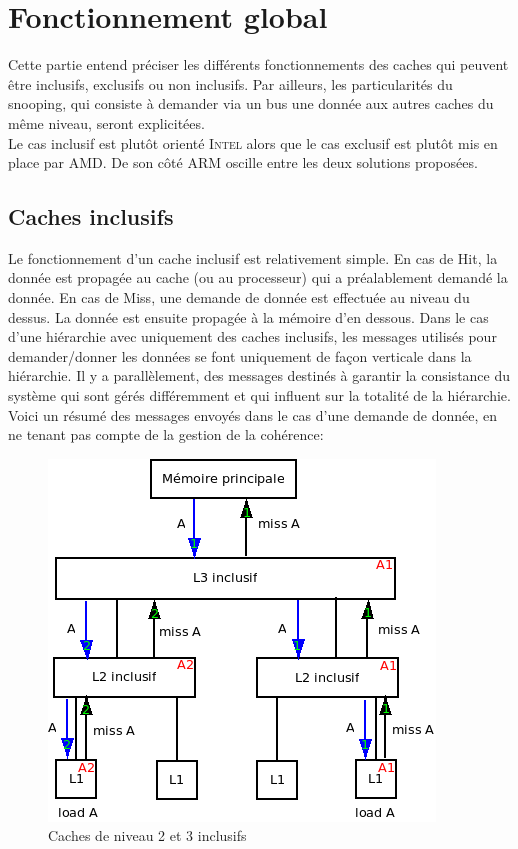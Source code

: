 \documentclass[a4paper]{article}
\begin{document}
\newpage
\section{Fonctionnement global}
\indent Cette partie entend préciser les différents fonctionnements des caches qui peuvent être inclusifs, exclusifs ou non inclusifs. Par ailleurs, les particularités du snooping, qui consiste à demander via un bus une donnée aux autres caches du même niveau, seront explicitées. \\

\indent Le cas inclusif est plutôt orienté \textsc{Intel} alors que le cas exclusif est plutôt mis en place par \textsc{AMD}. De son côté \textsc{ARM} oscille entre les deux solutions proposées.

\subsection{Caches inclusifs}
\indent Le fonctionnement d'un cache inclusif est relativement simple. En cas de Hit, la donnée est propagée au cache (ou au processeur) qui a préalablement demandé la donnée. En cas de Miss, une demande de donnée est effectuée au niveau du dessus. La donnée est ensuite propagée à la mémoire d'en dessous. Dans le cas d'une hiérarchie avec uniquement des caches inclusifs, les messages utilisés pour demander/donner les données se font uniquement de façon verticale dans la hiérarchie. Il y a parallèlement, des messages destinés à garantir la consistance du système qui sont gérés différemment et qui influent sur la totalité de la hiérarchie. Voici un résumé des messages envoyés dans le cas d'une demande de donnée, en ne tenant pas compte de la gestion de la cohérence: \\

\begin{figure}[!h]
\begin{center}
   \includegraphics[scale=0.7]{inclusifs.png}
   \caption{\label{inclusifs} Caches de niveau 2 et 3 inclusifs}
\end{center}
\end{figure}
\end{document}
